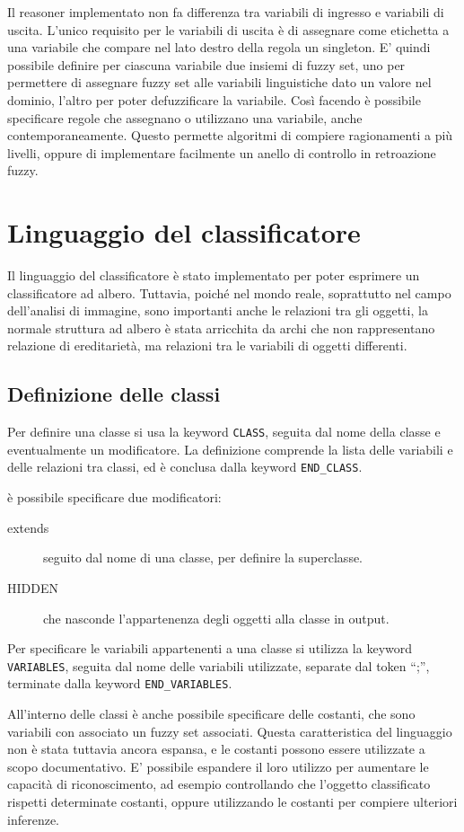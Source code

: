 Il reasoner implementato non fa differenza tra variabili di ingresso e variabili di uscita. L'unico requisito per le variabili di uscita è di assegnare come etichetta a una variabile che compare nel lato destro della regola un singleton. E' quindi possibile definire per ciascuna variabile due insiemi di fuzzy set, uno per permettere di assegnare fuzzy set alle variabili linguistiche dato un valore nel dominio, l'altro per poter defuzzificare la variabile. Così facendo è possibile specificare regole che assegnano o utilizzano una variabile, anche contemporaneamente. Questo permette algoritmi di compiere ragionamenti a più livelli, oppure di implementare facilmente un anello di controllo in retroazione fuzzy. 

\section{Linguaggio del classificatore}
Il linguaggio del classificatore è stato implementato per poter esprimere un classificatore ad albero. Tuttavia, poiché nel mondo reale, soprattutto nel campo dell'analisi di immagine, sono importanti anche le relazioni tra gli oggetti, la normale struttura ad albero è stata arricchita da archi che non rappresentano relazione di ereditarietà, ma relazioni tra le variabili di oggetti differenti.

\subsection{Definizione delle classi}
Per definire una classe si usa la keyword \verb|CLASS|, seguita dal nome della classe e eventualmente un modificatore. La definizione comprende la lista delle variabili e delle relazioni tra classi, ed è conclusa dalla keyword \verb|END_CLASS|.

è possibile specificare due modificatori:
\begin{description}
 \item [extends] seguito dal nome di una classe, per definire la superclasse.
 \item [HIDDEN] che nasconde l'appartenenza degli oggetti alla classe in output.
\end{description}

Per specificare le variabili appartenenti a una classe si utilizza la keyword \verb|VARIABLES|, seguita dal nome delle variabili utilizzate, separate dal token ``;'',  terminate dalla keyword \verb|END_VARIABLES|.

All'interno delle classi è anche possibile specificare delle costanti, che sono variabili con associato un fuzzy set associati. Questa caratteristica del linguaggio non è stata tuttavia ancora espansa, e le costanti possono essere utilizzate a scopo documentativo. E' possibile espandere il loro utilizzo per aumentare le capacità di riconoscimento, ad esempio controllando che l'oggetto classificato rispetti determinate costanti, oppure utilizzando le costanti per compiere ulteriori inferenze.

